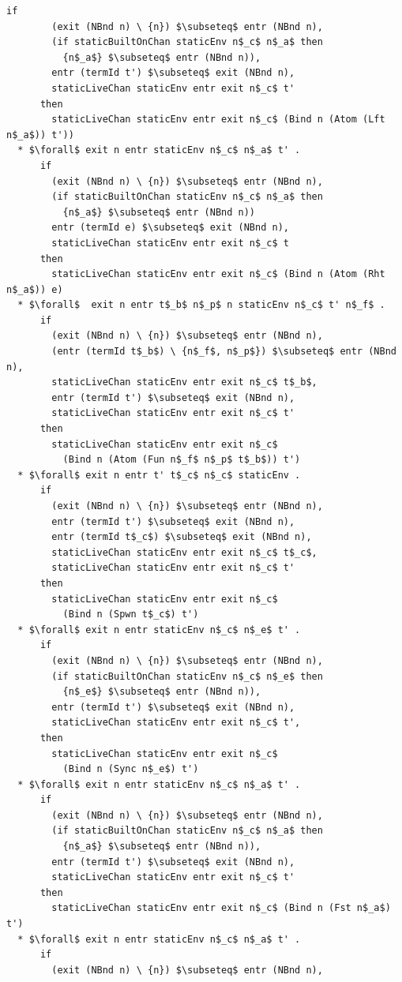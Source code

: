 \documentclass[letterpaper, 11pt]{extarticle}
\begin{document}
\begin{lstlisting}[language=logic, mathescape]
      if
        (exit (NBnd n) \ {n}) $\subseteq$ entr (NBnd n),
        (if staticBuiltOnChan staticEnv n$_c$ n$_a$ then
          {n$_a$} $\subseteq$ entr (NBnd n)),
        entr (termId t') $\subseteq$ exit (NBnd n),
        staticLiveChan staticEnv entr exit n$_c$ t'
      then
        staticLiveChan staticEnv entr exit n$_c$ (Bind n (Atom (Lft n$_a$)) t'))
  * $\forall$ exit n entr staticEnv n$_c$ n$_a$ t' . 
      if
        (exit (NBnd n) \ {n}) $\subseteq$ entr (NBnd n),
        (if staticBuiltOnChan staticEnv n$_c$ n$_a$ then
          {n$_a$} $\subseteq$ entr (NBnd n))
        entr (termId e) $\subseteq$ exit (NBnd n),
        staticLiveChan staticEnv entr exit n$_c$ t
      then
        staticLiveChan staticEnv entr exit n$_c$ (Bind n (Atom (Rht n$_a$)) e)
  * $\forall$  exit n entr t$_b$ n$_p$ n staticEnv n$_c$ t' n$_f$ . 
      if
        (exit (NBnd n) \ {n}) $\subseteq$ entr (NBnd n),
        (entr (termId t$_b$) \ {n$_f$, n$_p$}) $\subseteq$ entr (NBnd n),
        staticLiveChan staticEnv entr exit n$_c$ t$_b$,
        entr (termId t') $\subseteq$ exit (NBnd n),
        staticLiveChan staticEnv entr exit n$_c$ t'
      then
        staticLiveChan staticEnv entr exit n$_c$
          (Bind n (Atom (Fun n$_f$ n$_p$ t$_b$)) t')
  * $\forall$ exit n entr t' t$_c$ n$_c$ staticEnv .
      if
        (exit (NBnd n) \ {n}) $\subseteq$ entr (NBnd n),
        entr (termId t') $\subseteq$ exit (NBnd n),
        entr (termId t$_c$) $\subseteq$ exit (NBnd n),
        staticLiveChan staticEnv entr exit n$_c$ t$_c$,
        staticLiveChan staticEnv entr exit n$_c$ t'
      then
        staticLiveChan staticEnv entr exit n$_c$
          (Bind n (Spwn t$_c$) t')
  * $\forall$ exit n entr staticEnv n$_c$ n$_e$ t' .
      if
        (exit (NBnd n) \ {n}) $\subseteq$ entr (NBnd n),
        (if staticBuiltOnChan staticEnv n$_c$ n$_e$ then
          {n$_e$} $\subseteq$ entr (NBnd n)),
        entr (termId t') $\subseteq$ exit (NBnd n),
        staticLiveChan staticEnv entr exit n$_c$ t',
      then
        staticLiveChan staticEnv entr exit n$_c$
          (Bind n (Sync n$_e$) t')
  * $\forall$ exit n entr staticEnv n$_c$ n$_a$ t' .
      if
        (exit (NBnd n) \ {n}) $\subseteq$ entr (NBnd n),
        (if staticBuiltOnChan staticEnv n$_c$ n$_a$ then
          {n$_a$} $\subseteq$ entr (NBnd n)),
        entr (termId t') $\subseteq$ exit (NBnd n),
        staticLiveChan staticEnv entr exit n$_c$ t'
      then
        staticLiveChan staticEnv entr exit n$_c$ (Bind n (Fst n$_a$) t')
  * $\forall$ exit n entr staticEnv n$_c$ n$_a$ t' .
      if 
        (exit (NBnd n) \ {n}) $\subseteq$ entr (NBnd n),

\end{lstlisting}
\end{document}
